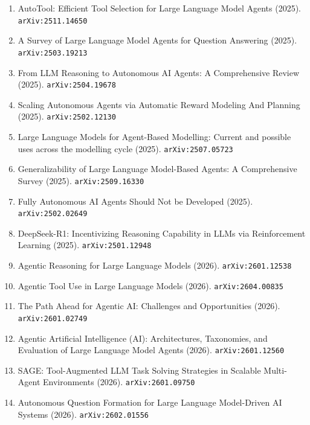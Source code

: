 \documentclass[11pt]{article}
\begin{document}
\begin{enumerate}
  \item AutoTool: Efficient Tool Selection for Large Language Model Agents (2025). \texttt{arXiv:2511.14650}
  \item A Survey of Large Language Model Agents for Question Answering (2025). \texttt{arXiv:2503.19213}
  \item From LLM Reasoning to Autonomous AI Agents: A Comprehensive Review (2025). \texttt{arXiv:2504.19678}
  \item Scaling Autonomous Agents via Automatic Reward Modeling And Planning (2025). \texttt{arXiv:2502.12130}
  \item Large Language Models for Agent-Based Modelling: Current and possible uses across the modelling cycle (2025). \texttt{arXiv:2507.05723}
  \item Generalizability of Large Language Model-Based Agents: A Comprehensive Survey (2025). \texttt{arXiv:2509.16330}
  \item Fully Autonomous AI Agents Should Not be Developed (2025). \texttt{arXiv:2502.02649}
  \item DeepSeek-R1: Incentivizing Reasoning Capability in LLMs via Reinforcement Learning (2025). \texttt{arXiv:2501.12948}
  \item Agentic Reasoning for Large Language Models (2026). \texttt{arXiv:2601.12538}
  \item Agentic Tool Use in Large Language Models (2026). \texttt{arXiv:2604.00835}
  \item The Path Ahead for Agentic AI: Challenges and Opportunities (2026). \texttt{arXiv:2601.02749}
  \item Agentic Artificial Intelligence (AI): Architectures, Taxonomies, and Evaluation of Large Language Model Agents (2026). \texttt{arXiv:2601.12560}
  \item SAGE: Tool-Augmented LLM Task Solving Strategies in Scalable Multi-Agent Environments (2026). \texttt{arXiv:2601.09750}
  \item Autonomous Question Formation for Large Language Model-Driven AI Systems (2026). \texttt{arXiv:2602.01556}
\end{enumerate}
\end{document}

